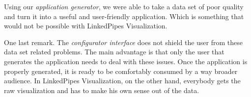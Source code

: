 Using our \emph{application generator}, we were able to take a data set of poor quality and turn it into a useful and user-friendly application. Which is something that would not be possible with LinkedPipes Visualization.

One last remark. The \emph{configurator interface} does not shield the user from these data set related problems. The main advantage is that only the user that generates the application needs to deal with these issues. Once the application is properly generated, it is ready to be comfortably consumed by a way broader audience. In LinkedPipes Visualization, on the other hand, everybody gets the raw visualization and has to make his own sense out of the data.
